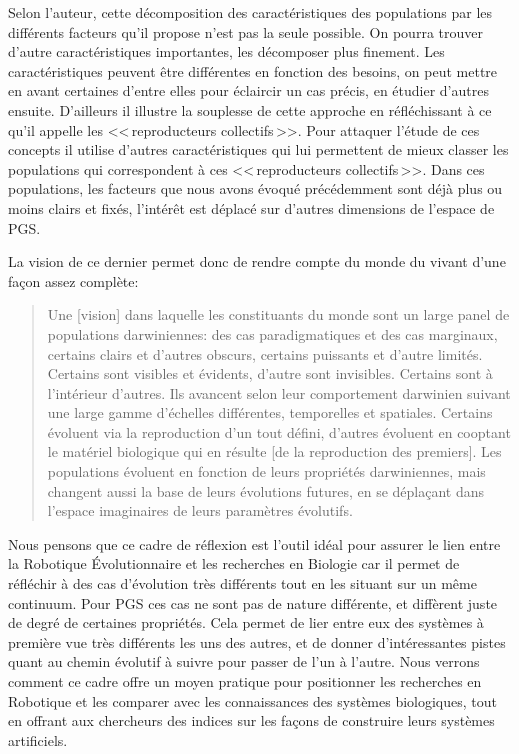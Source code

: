 Selon l'auteur, cette décomposition des caractéristiques des populations par les différents facteurs qu'il propose n'est pas la seule possible. On pourra trouver d'autre caractéristiques importantes, les décomposer plus finement. Les caractéristiques peuvent être différentes en fonction des besoins, on peut mettre en avant certaines d'entre elles pour éclaircir un cas précis, en étudier d'autres ensuite. D'ailleurs il illustre la souplesse de cette approche en réfléchissant à ce qu'il appelle les <<\,reproducteurs collectifs\,>>. Pour attaquer l'étude de ces concepts il utilise d'autres caractéristiques qui lui permettent de mieux classer les populations qui correspondent à ces <<\,reproducteurs collectifs\,>>. Dans ces populations, les facteurs que nous avons évoqué précédemment sont déjà plus ou moins clairs et fixés, l'intérêt est déplacé sur d'autres dimensions de l'espace de PGS.

La vision de ce dernier permet donc de rendre compte du monde du vivant d'une façon assez complète:
\begin{quotation}
	Une [vision] dans laquelle les constituants du monde sont un large panel de populations darwiniennes: des cas paradigmatiques et des cas marginaux, certains clairs et d'autres obscurs, certains puissants et d'autre limités. Certains sont visibles et évidents, d'autre sont invisibles. Certains sont à l'intérieur d'autres. Ils avancent selon leur comportement darwinien suivant une large gamme d'échelles différentes, temporelles et spatiales. Certains évoluent via la reproduction d'un tout défini, d'autres évoluent en cooptant le matériel biologique qui en résulte [de la reproduction des premiers]. Les populations évoluent en fonction de leurs propriétés darwiniennes, mais changent aussi la base de leurs évolutions futures, en se déplaçant dans l'espace imaginaires de leurs paramètres évolutifs.\\
	\citep[p.~128]{godfrey2009darwinian}
\end{quotation}

Nous pensons que ce cadre de réflexion est l'outil idéal pour assurer le lien entre la Robotique \'Evolutionnaire et les recherches en Biologie car il permet de réfléchir à des cas d'évolution très différents tout en les situant sur un même continuum. Pour PGS ces cas ne sont pas de nature différente, et diffèrent juste de degré de certaines propriétés. Cela permet de lier entre eux des systèmes à première vue très différents les uns des autres, et de donner d'intéressantes pistes quant au chemin évolutif à suivre pour passer de l'un à l'autre. Nous verrons comment ce cadre offre un moyen pratique pour positionner les recherches en Robotique et les comparer avec les connaissances des systèmes biologiques, tout en offrant aux chercheurs des indices sur les façons de construire leurs systèmes artificiels.


